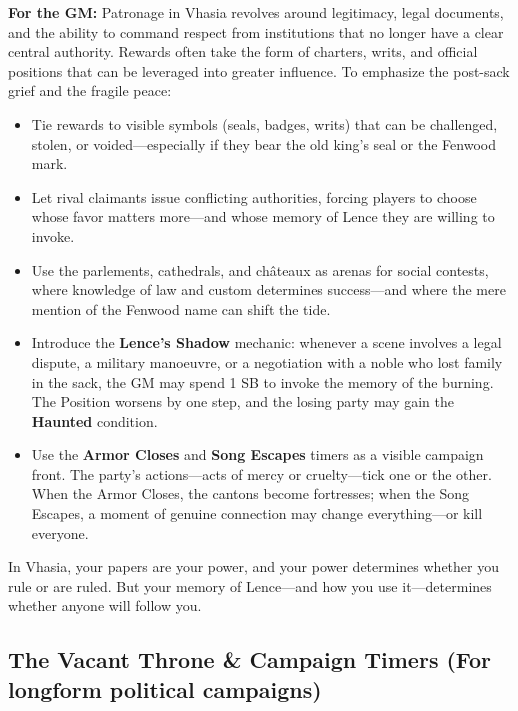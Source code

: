 \begin{tcolorbox}[colback=black!3,colframe=black!40!white,title={Patronage \& Power},breakable]
\textbf{For the GM:} Patronage in Vhasia revolves around legitimacy, legal documents, and the ability to command respect from institutions that no longer have a clear central authority. Rewards often take the form of charters, writs, and official positions that can be leveraged into greater influence. To emphasize the post-sack grief and the fragile peace:
\begin{itemize}
  \item Tie rewards to visible symbols (seals, badges, writs) that can be challenged, stolen, or voided---especially if they bear the old king's seal or the Fenwood mark.
  \item Let rival claimants issue conflicting authorities, forcing players to choose whose favor matters more---and whose memory of Lence they are willing to invoke.
  \item Use the parlements, cathedrals, and châteaux as arenas for social contests, where knowledge of law and custom determines success---and where the mere mention of the Fenwood name can shift the tide.
  \item Introduce the \textbf{Lence's Shadow} mechanic: whenever a scene involves a legal dispute, a military manoeuvre, or a negotiation with a noble who lost family in the sack, the GM may spend 1 SB to invoke the memory of the burning. The Position worsens by one step, and the losing party may gain the \textbf{Haunted} condition.
  \item Use the \textbf{Armor Closes} and \textbf{Song Escapes} timers as a visible campaign front. The party's actions---acts of mercy or cruelty---tick one or the other. When the Armor Closes, the cantons become fortresses; when the Song Escapes, a moment of genuine connection may change everything---or kill everyone.
\end{itemize}
In Vhasia, your papers are your power, and your power determines whether you rule or are ruled. But your memory of Lence---and how you use it---determines whether anyone will follow you.
\end{tcolorbox}

\subsection*{The Vacant Throne \& Campaign Timers (For longform political campaigns)}
\label{sec:vhasia-campaign-timers}

